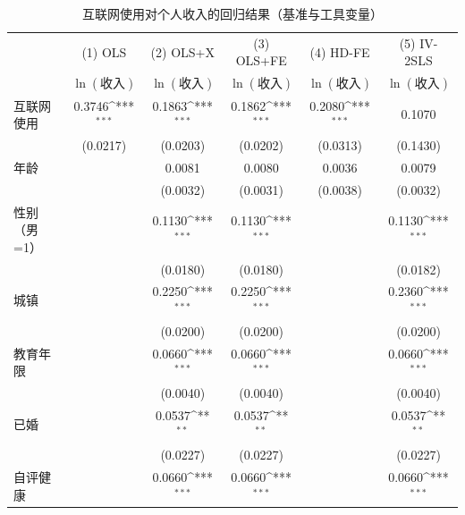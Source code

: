\begin{table}[htbp]
\centering
\def\sym#1{\ifmmode^{#1}\else\(^{#1}\)\fi}
\caption{互联网使用对个人收入的回归结果（基准与工具变量）}
\label{tab:main_regs}
\begin{tabular}{lccccc}
\hline\hline
                &\multicolumn{1}{c}{(1) OLS}&\multicolumn{1}{c}{(2) OLS+X}&\multicolumn{1}{c}{(3) OLS+FE}&\multicolumn{1}{c}{(4) HD-FE}&\multicolumn{1}{c}{(5) IV-2SLS}\\
                &\multicolumn{1}{c}{$\ln(\text{收入})$}&\multicolumn{1}{c}{$\ln(\text{收入})$}&\multicolumn{1}{c}{$\ln(\text{收入})$}&\multicolumn{1}{c}{$\ln(\text{收入})$}&\multicolumn{1}{c}{$\ln(\text{收入})$}\\
\hline
互联网使用       &   0.3746\sym{***}&   0.1863\sym{***}&   0.1862\sym{***}&   0.2080\sym{***}&   0.1070         \\
                & (0.0217)         & (0.0203)         & (0.0202)         & (0.0313)         & (0.1430)         \\
年龄            &                  &   0.0081         &   0.0080         &   0.0036         &   0.0079         \\
                &                  & (0.0032)         & (0.0031)         & (0.0038)         & (0.0032)         \\
性别（男=1）     &                  &   0.1130\sym{***}&   0.1130\sym{***}&                  &   0.1130\sym{***}\\
                &                  & (0.0180)         & (0.0180)         &                  & (0.0182)         \\
城镇            &                  &   0.2250\sym{***}&   0.2250\sym{***}&                  &   0.2360\sym{***}\\
                &                  & (0.0200)         & (0.0200)         &                  & (0.0200)         \\
教育年限         &                  &   0.0660\sym{***}&   0.0660\sym{***}&                  &   0.0660\sym{***}\\
                &                  & (0.0040)         & (0.0040)         &                  & (0.0040)         \\
已婚            &                  &   0.0537\sym{**} &   0.0537\sym{**} &                  &   0.0537\sym{**} \\
                &                  & (0.0227)         & (0.0227)         &                  & (0.0227)         \\
自评健康         &                  &   0.0660\sym{***}&   0.0660\sym{***}&                  &   0.0660\sym{***}\\

\end{tabular}
\end{table}

